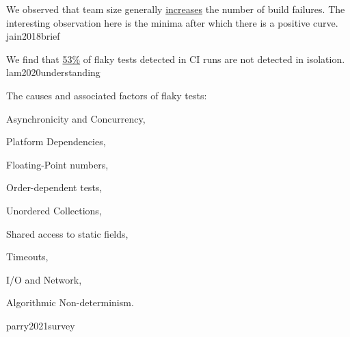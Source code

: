 \documentclass{article}
\begin{document}
  {We observed that team size generally \ul{increases} the number of build failures. The interesting observation here is the minima after which there is a positive curve.}
  {jain2018brief}


  {We find that \ul{53\%} of flaky tests detected in CI runs are not detected in isolation.}
  {lam2020understanding}

  {The causes and associated factors of flaky tests: \begin{enumerate*}
    \item Asynchronicity and Concurrency,
    \item Platform Dependencies,
    \item Floating-Point numbers,
    \item Order-dependent tests,
    \item Unordered Collections,
    \item Shared access to static fields,
    \item Timeouts,
    \item I/O and Network,
    \item Algorithmic Non-determinism.
  \end{enumerate*}}
  {parry2021survey}
\end{document}
